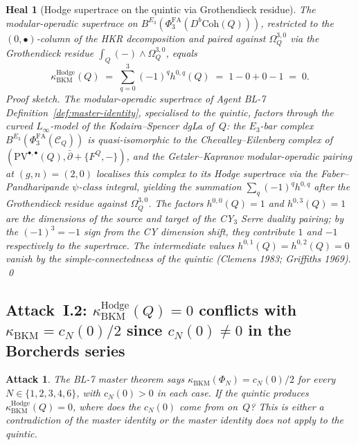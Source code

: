 \documentclass[11pt]{amsart}
\newtheorem{attack}[theorem]{Attack}
\newtheorem{heal}[theorem]{Heal}
\providecommand{\cC}{\mathcal{C}}
\providecommand{\PhiFA}{\Phi^{\mathrm{FA}}}
\providecommand{\Coh}{\mathrm{Coh}}
\providecommand{\PV}{\mathrm{PV}}
\providecommand{\kBKM}{\kappa_{\mathrm{BKM}}}
\providecommand{\Hdg}{\mathrm{Hodge}}
\begin{document}
\begin{heal}[Hodge supertrace on the quintic via Grothendieck residue]
\label{heal:hodge-quintic-residue}
The modular-operadic supertrace on $B^{E_3}(\PhiFA_3(D^b\Coh(Q)))$,
restricted to the $(0, \bullet)$-column of the HKR decomposition and
paired against $\Omega_Q^{3,0}$ via the Grothendieck residue
$\int_Q (-) \wedge \Omega_Q^{3,0}$, equals
\[
\kBKM^{\Hdg}(Q) \;=\; \sum_{q = 0}^{3} (-1)^q h^{0,q}(Q)
\;=\; 1 - 0 + 0 - 1 \;=\; 0.
\]
\emph{Proof sketch.} The modular-operadic supertrace of Agent BL-7
Definition~\ref{def:master-identity}, specialised to the quintic,
factors through the curved $L_\infty$-model of the Kodaira--Spencer
dgLa of~$Q$: the $E_3$-bar complex $B^{E_3}(\PhiFA_3(\cC_Q))$ is
quasi-isomorphic to the Chevalley--Eilenberg complex of
$(\PV^{\bullet, \bullet}(Q), \bar\partial + \{F^Q, -\})$, and the
Getzler--Kapranov modular-operadic pairing at $(g, n) = (2, 0)$
localises this complex to its Hodge supertrace via the
Faber--Pandharipande $\psi$-class integral, yielding the summation
$\sum_q (-1)^q h^{0,q}$ after the Grothendieck residue against
$\Omega_Q^{3,0}$. The factors $h^{0,0}(Q) = 1$ and
$h^{0,3}(Q) = 1$ are the dimensions of the source and target of the
CY$_3$ Serre duality pairing; by the $(-1)^3 = -1$ sign from the CY
dimension shift, they contribute $1$ and $-1$ respectively to the
supertrace. The intermediate values $h^{0,1}(Q) = h^{0,2}(Q) = 0$
vanish by the simple-connectedness of the quintic (Clemens 1983;
Griffiths 1969).
\qed
\end{heal}

\subsection{Attack~I.2: $\kBKM^{\Hdg}(Q) = 0$ conflicts with $\kBKM =
c_N(0)/2$ since $c_N(0) \neq 0$ in the Borcherds series}

\begin{attack}
\label{att:kbkm-hodge-vs-borcherds}
The BL-7 master theorem says $\kBKM(\Phi_N) = c_N(0)/2$ for every
$N \in \{1, 2, 3, 4, 6\}$, with $c_N(0) > 0$ in each case. If the
quintic produces $\kBKM^{\Hdg}(Q) = 0$, where does the $c_N(0)$
come from on~$Q$? This is either a contradiction of the master
identity or the master identity does not apply to the quintic.
\end{attack}
\end{document}
